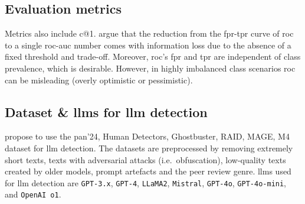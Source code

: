 \subsection{Evaluation metrics}
Metrics also include c@1.
\citet{llm_detection_av_2025} argue that the reduction from the \ac{fpr}-\ac{tpr} curve of \ac{roc} to a single \ac{roc-auc} number 
comes with information loss due to the absence of a fixed threshold and trade-off.
Moreover, \ac{roc}'s \ac{fpr} and \ac{tpr} are independent of class prevalence, which is desirable.
However, in highly imbalanced class scenarios \ac{roc} can be misleading (overly optimistic or pessimistic).

\subsection{Dataset \& \acp{llm} for \ac{llm} detection} 
\citet{llm_detection_av_2025} propose to use the \ac{pan}'24, Human Detectors, Ghostbuster, RAID, MAGE, M4 dataset for \ac{llm} detection.
The datasets are preprocessed by removing extremely short texts, texts with adversarial attacks (i.e.\ obfuscation), 
low-quality texts created by older models, prompt artefacts and the peer review genre.
\acp{llm} used for \ac{llm} detection are \texttt{GPT-3.x}, \texttt{GPT-4}, \texttt{LLaMA2}, \texttt{Mistral}, \texttt{GPT-4o}, 
\texttt{GPT-4o-mini}, and \texttt{OpenAI o1}.
